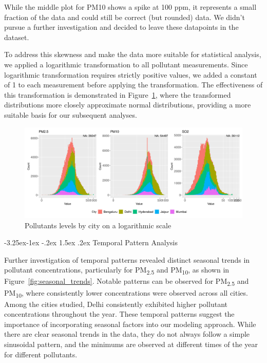 \documentclass[twoside,11pt]{article}
\makeatletter
\renewcommand\subsubsection{\@startsection{subsubsection}{3}{\z@}%
  {-3.25ex\@plus -1ex \@minus -.2ex}%
  {1.5ex \@plus .2ex}%
  {\normalfont\bfseries\normalsize}}
\makeatother
\begin{document}
While the middle plot for PM10 shows a spike at 100 ppm, it represents a small fraction of the data and could still be correct (but rounded) data. We didn't pursue a further investigation and decided to leave these datapoints in the dataset.

To address this skewness and make the data more suitable for statistical analysis, we applied a logarithmic transformation to all pollutant measurements. Since logarithmic transformation requires strictly positive values, we added a constant of 1 to each measurement before applying the transformation. The effectiveness of this transformation is demonstrated in Figure~\ref{fig:log_scaled_pollutants}, where the transformed distributions more closely approximate normal distributions, providing a more suitable basis for our subsequent analyses.

\begin{figure}[H]
  \centering
  \includegraphics[width=\textwidth]{assets/log-scaled-pollutants.png}
  \caption{Pollutants levels by city on a logarithmic scale}
  \label{fig:log_scaled_pollutants}
\end{figure}

\subsubsection{Temporal Pattern Analysis}

Further investigation of temporal patterns revealed distinct seasonal trends in pollutant concentrations, particularly for PM\textsubscript{2.5} and PM\textsubscript{10}, as shown in Figure~\ref{fig:seasonal_trends}. Notable patterns can be observed for PM\textsubscript{2.5} and PM\textsubscript{10}, where consistently lower concentrations were observed across all cities. Among the cities studied, Delhi consistently exhibited higher pollutant concentrations throughout the year. These temporal patterns suggest the importance of incorporating seasonal factors into our modeling approach. While there are clear seasonal trends in the data, they do not always follow a simple sinusoidal pattern, and the minimums are observed at different times of the year for different pollutants.
\end{document}
